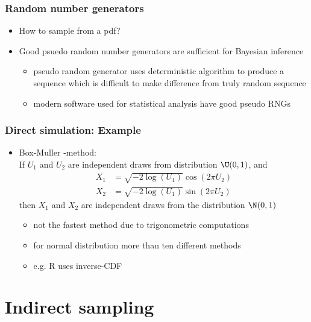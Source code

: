\documentclass[10pt]{beamer}
\begin{document}
\begin{frame}

\frametitle{Random number generators}

  \begin{itemize}
  \item {\color{uured}How to sample from a pdf?}
  \pause
  \item Good {\color{uured} psuedo} random number generators are sufficient for Bayesian inference
  \begin{itemize}
    \item pseudo random generator uses deterministic algorithm to
      produce a sequence which is difficult to make difference from
      truly random sequence
    \item modern software used for statistical analysis have good
      pseudo RNGs
    \end{itemize}
  \end{itemize}

\end{frame}

\begin{frame}


\frametitle{Direct simulation: Example}

  \begin{itemize}
  \item Box-Muller -method:\\ If $U_1$ and $U_2$ are independent
    draws from distribution $\U(0,1)$, and
    \begin{align*}
      X_1 & = \sqrt{-2\log(U_1)}\cos(2\pi U_2) \\
      X_2 & = \sqrt{-2\log(U_1)}\sin(2\pi U_2)
    \end{align*}
    then $X_1$ and $X_2$ are independent draws from the distribution
    $\N(0,1)$
    \pause
    \begin{itemize}
      \item not the fastest method due to trigonometric computations
      \item for normal distribution more than ten different methods
      \item e.g. R uses inverse-CDF
    \end{itemize}
  \end{itemize}

\end{frame}

\section{Indirect sampling}
\frame{\sectionpage}
\end{document}
